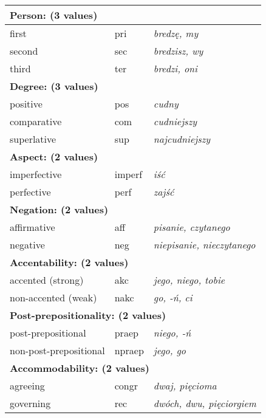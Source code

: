 \documentclass[12pt]{article}
\begin{document}
\begin{table}[H]
\begin{tabular}{|l|l|l|}
        \multicolumn{3}{l}{\textbf{Person: (3 values)}}
       \\ \hline
	    first & pri & \textit{bredzę, my}\\ \hline
	    second & sec & \textit{bredzisz, wy}\\ \hline
	    third & ter & \textit{bredzi, oni}\\ \hline
        
        \multicolumn{3}{l}{\textbf{Degree: (3 values)}}
       \\ \hline
	    positive & pos & \textit{cudny}\\ \hline
	    comparative & com & \textit{cudniejszy}\\ \hline
	    superlative & sup & \textit{najcudniejszy}\\ \hline
        
        \multicolumn{3}{l}{\textbf{Aspect: (2 values)}}
       \\ \hline
	    imperfective & imperf & \textit{iść}\\ \hline
	    perfective & perf & \textit{zajść}\\ \hline
        
        \multicolumn{3}{l}{\textbf{Negation: (2 values)}}
       \\ \hline
	    affirmative & aff & \textit{pisanie, czytanego}\\ \hline
	    negative & neg & \textit{niepisanie, nieczytanego}\\ \hline
        
        \multicolumn{3}{l}{\textbf{Accentability: (2 values)}}
       \\ \hline
	    accented (strong) & akc & \textit{jego, niego, tobie}\\ \hline
	    non-accented (weak) & nakc & \textit{go, -ń, ci}\\ \hline
        
        \multicolumn{3}{l}{\textbf{Post-prepositionality: (2 values)}}
       \\ \hline
	    post-prepositional & praep & \textit{niego, -ń}\\ \hline
	    non-post-prepositional & npraep & \textit{jego, go}\\ \hline
        
        \multicolumn{3}{l}{\textbf{Accommodability: (2 values)}}
       \\ \hline
	    agreeing & congr & \textit{dwaj, pięcioma}\\ \hline
	    governing & rec & \textit{dwóch, dwu, pięciorgiem}\\ \hline
        

\end{tabular}
\end{table}
\end{document}
